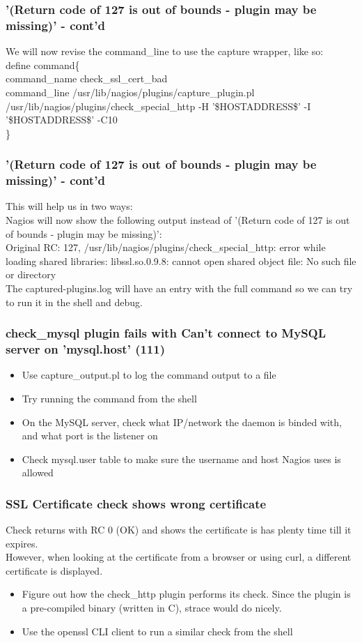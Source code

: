 \documentclass[aspectratio=169]{beamer}
\begin{document}
\begin{frame}
\frametitle{'(Return code of 127 is out of bounds - plugin may be missing)' - cont'd}
We will now revise the command\_line to use the capture wrapper, like so: \\ 
\bigskip
define command\{ \\
    command\_name check\_ssl\_cert\_bad \\
    command\_line   /usr/lib/nagios/plugins/capture\_plugin.pl   /usr/lib/nagios/plugins/check\_special\_http -H '\$HOSTADDRESS\$' -I '\$HOSTADDRESS\$' -C10 \\
\}
\end{frame}

\begin{frame}
\frametitle{'(Return code of 127 is out of bounds - plugin may be missing)' - cont'd}
This will help us in two ways: \\
Nagios will now show the following output instead of '(Return code of 127 is out of bounds - plugin may be missing)': \\
\bigskip
Original RC: 127, /usr/lib/nagios/plugins/check\_special\_http: error while loading shared libraries: libssl.so.0.9.8: cannot open shared object file: No such file or directory \\
\bigskip
The captured-plugins.log will have an entry with the full command so we can try to run it in the shell and debug.
\end{frame}

\begin{frame}
\frametitle{check\_mysql plugin fails with Can't connect to MySQL server on 'mysql.host' (111)}
\begin{itemize}
\item Use capture\_output.pl to log the command output to a file
\item Try running the command from the shell
\item On the MySQL server, check what IP/network the daemon is binded with, and what port is the listener on
\item Check mysql.user table to make sure the username and host Nagios uses is allowed
\end{itemize}
\end{frame}

\begin{frame}
\frametitle{SSL Certificate check shows wrong certificate}
Check returns with RC 0 (OK) and shows the certificate is has plenty time till it expires. \\ 
However, when looking at the certificate from a browser or using curl, a different certificate is displayed. \\

\begin{itemize}
    \item Figure out how the check\_http plugin performs its check. Since the plugin is a pre-compiled binary (written in C), strace would do nicely.
\item Use the openssl CLI client to run a similar check from the shell
\end{itemize}
\end{frame}
\end{document}
